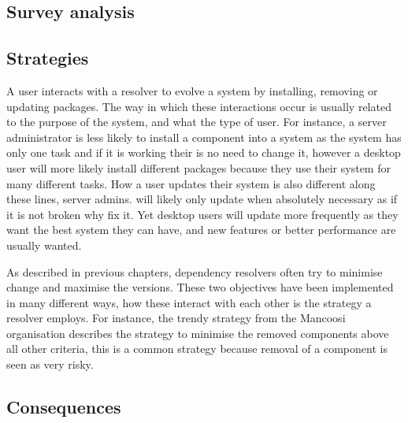 \subsection{Survey analysis}





\subsection{Strategies}
A user interacts with a resolver to evolve a system by installing, removing or updating packages.
The way in which these interactions occur is usually related to the purpose of the system, and what the type of user.
For instance, a server administrator is less likely to install a component into a system as the system has only one task and if it is working their is no need to change it, 
however a desktop user will more likely install different packages because they use their system for many different tasks.
How a user updates their system is also different along these lines, server admins. will likely only update when absolutely necessary as if it is not broken why fix it.
Yet desktop users will update more frequently as they want the best system they can have, and new features or better performance are usually wanted.

As described in previous chapters, dependency resolvers often try to minimise change and maximise the versions.
These two objectives have been implemented in many different ways, how these interact with each other is the strategy a resolver employs.
For instance, the trendy strategy from the Mancoosi organisation describes the strategy to minimise the removed components above all other criteria,
this is a common strategy because removal of a component is seen as very risky.

\subsection{Consequences}

